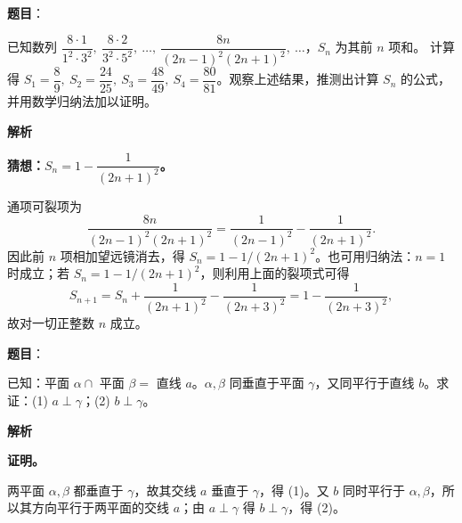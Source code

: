 \begin{answer}

\textbf{题目}：

已知数列
$\dfrac{8\cdot1}{1^2\cdot3^2},\ \dfrac{8\cdot2}{3^2\cdot5^2},\ \ldots,\ \dfrac{8n}{(2n-1)^2(2n+1)^2},\ \ldots$，$S_n$ 为其前 $n$ 项和。
计算得 $S_1=\dfrac89,\ S_2=\dfrac{24}{25},\ S_3=\dfrac{48}{49},\ S_4=\dfrac{80}{81}$。观察上述结果，推测出计算 $S_n$ 的公式，并用数学归纳法加以证明。

\textbf{解析}

\textbf{猜想：$S_n=1-\dfrac1{(2n+1)^2}$。}

通项可裂项为
\nopagebreak[4]
\[
\frac{8n}{(2n-1)^2(2n+1)^2}
=\frac1{(2n-1)^2}-\frac1{(2n+1)^2}.
\]
因此前 $n$ 项相加望远镜消去，得 $S_n=1-1/(2n+1)^2$。也可用归纳法：$n=1$ 时成立；若 $S_n=1-1/(2n+1)^2$，则利用上面的裂项式可得
\nopagebreak[4]
\[
S_{n+1}=S_n+\frac1{(2n+1)^2}-\frac1{(2n+3)^2}
=1-\frac1{(2n+3)^2},
\]
故对一切正整数 $n$ 成立。


\end{answer}
\begin{answer}

\textbf{题目}：

已知：平面 $\alpha\cap$ 平面 $\beta=$ 直线 $a$。$\alpha,\beta$ 同垂直于平面 $\gamma$，又同平行于直线 $b$。求证：(1) $a\perp\gamma$；(2) $b\perp\gamma$。

\textbf{解析}

\textbf{证明。}

两平面 $\alpha,\beta$ 都垂直于 $\gamma$，故其交线 $a$ 垂直于 $\gamma$，得 (1)。又 $b$ 同时平行于 $\alpha,\beta$，所以其方向平行于两平面的交线 $a$；由 $a\perp\gamma$ 得 $b\perp\gamma$，得 (2)。


\end{answer}
